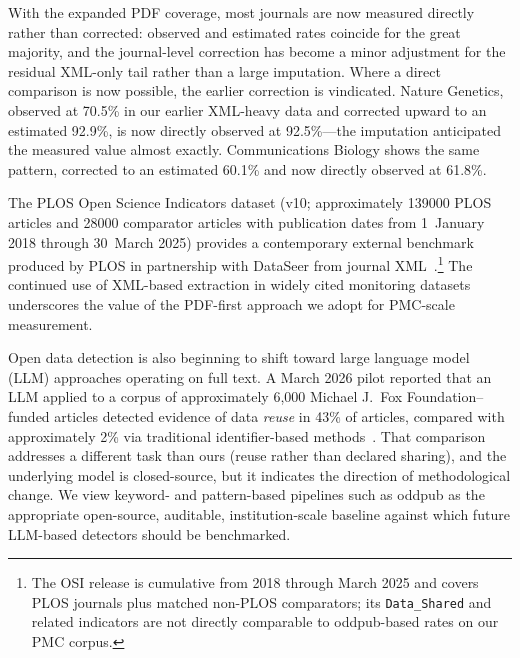 With the expanded PDF coverage, most journals are now measured directly rather than corrected: observed and estimated rates coincide for the great majority, and the journal-level correction has become a minor adjustment for the residual XML-only tail rather than a large imputation. Where a direct comparison is now possible, the earlier correction is vindicated. Nature Genetics, observed at 70.5\% in our earlier XML-heavy data and corrected upward to an estimated 92.9\%, is now directly observed at 92.5\%---the imputation anticipated the measured value almost exactly. Communications Biology shows the same pattern, corrected to an estimated 60.1\% and now directly observed at 61.8\%.

The PLOS Open Science Indicators dataset (v10; approximately \num{139000} PLOS articles and \num{28000} comparator articles with publication dates from 1~January 2018 through 30~March 2025) provides a contemporary external benchmark produced by PLOS in partnership with DataSeer from journal XML~\cite{PLOS2025-zb}.\footnote{The OSI release is cumulative from 2018 through March 2025 and covers PLOS journals plus matched non-PLOS comparators; its \texttt{Data\_Shared} and related indicators are not directly comparable to oddpub-based rates on our PMC corpus.} The continued use of XML-based extraction in widely cited monitoring datasets underscores the value of the PDF-first approach we adopt for PMC-scale measurement.

Open data detection is also beginning to shift toward large language model (LLM) approaches operating on full text. A March 2026 pilot reported that an LLM applied to a corpus of approximately 6{,}000 Michael J.\ Fox Foundation--funded articles detected evidence of data \emph{reuse} in 43\% of articles, compared with approximately 2\% via traditional identifier-based methods~\cite{resrch_info2026-ar}. That comparison addresses a different task than ours (reuse rather than declared sharing), and the underlying model is closed-source, but it indicates the direction of methodological change. We view keyword- and pattern-based pipelines such as oddpub as the appropriate open-source, auditable, institution-scale baseline against which future LLM-based detectors should be benchmarked.

